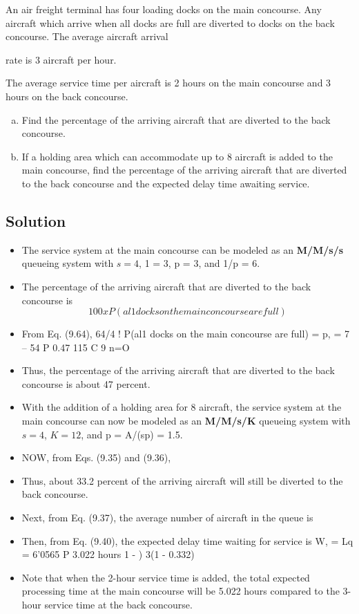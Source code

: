 \documentclass[a4paper12pt]{article}
\begin{document}
\large 




\noindent An air freight terminal has four loading docks on the main concourse. Any aircraft which arrive 
when all docks are full are diverted to docks on the back concourse. The average aircraft arrival

rate is 3 aircraft per hour. 

The average service time per aircraft is 2 hours on the main concourse and 3 hours on the back concourse. 
\begin{enumerate}[(a)]
    \item Find the percentage of the arriving aircraft that are diverted to the back concourse. 
    \item If a holding area which can accommodate up to 8 aircraft is added to the main concourse, 
find the percentage of the arriving aircraft that are diverted to the back concourse and the 
expected delay time awaiting service. 
\end{enumerate}

\subsection*{Solution}

\begin{itemize}
    \item The service system at the main concourse can be modeled as an \textbf{M/M/s/s} queueing system with $s = 4$, 
1 = 3, p = 3, and 1/p = 6. 
\item The percentage of the arriving aircraft that are diverted to the back concourse is 
\[100 x P(al1 docks on the main concourse are full) \]
    \item From Eq. (9.64), 
64/4 ! P(al1 docks on the main concourse are full) = p, = 7 -- 54 P 0.47 115 C 9 n=O 
    \item Thus, the percentage of the arriving aircraft that are diverted to the back concourse is about 47 
percent. 
    \item With the addition of a holding area for 8 aircraft, the service system at the main concourse can now be 
modeled as an \textbf{M/M/s/K} queueing system with $s = 4$, $K = 12$, and p = A/(sp) = 1.5. 
\item NOW, from Eqs. 
(9.35) and (9.36), 
    \item Thus, about 33.2 percent of the arriving aircraft will still be diverted to the back concourse. 
    \item Next, from Eq. (9.37), the average number of aircraft in the queue is 
    \item Then, from Eq. (9.40), the expected delay time waiting for service is 
W, = Lq = 6'0565 P 3.022 hours 
1 - ) 3(1 - 0.332) 
    \item Note that when the 2-hour service time is added, the total expected processing time at the main 
concourse will be 5.022 hours compared to the 3-hour service time at the back concourse. 
\end{itemize}
\end{document}
